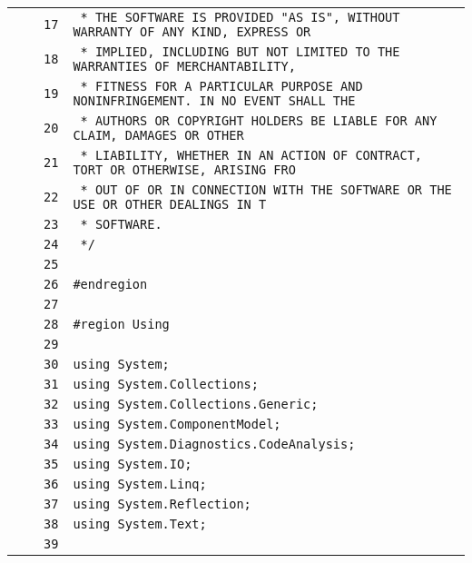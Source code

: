 \documentclass[a4paper,10pt]{article}
\begin{document}
\begin{longtable}[l]{lrrl}
\cellcolor{gray} &  & \verb~17~ & \verb~ * THE SOFTWARE IS PROVIDED "AS IS", WITHOUT WARRANTY OF ANY KIND, EXPRESS OR~\\
\cellcolor{gray} &  & \verb~18~ & \verb~ * IMPLIED, INCLUDING BUT NOT LIMITED TO THE WARRANTIES OF MERCHANTABILITY,~\\
\cellcolor{gray} &  & \verb~19~ & \verb~ * FITNESS FOR A PARTICULAR PURPOSE AND NONINFRINGEMENT. IN NO EVENT SHALL THE~\\
\cellcolor{gray} &  & \verb~20~ & \verb~ * AUTHORS OR COPYRIGHT HOLDERS BE LIABLE FOR ANY CLAIM, DAMAGES OR OTHER~\\
\cellcolor{gray} &  & \verb~21~ & \verb~ * LIABILITY, WHETHER IN AN ACTION OF CONTRACT, TORT OR OTHERWISE, ARISING FRO~\\
\cellcolor{gray} &  & \verb~22~ & \verb~ * OUT OF OR IN CONNECTION WITH THE SOFTWARE OR THE USE OR OTHER DEALINGS IN T~\\
\cellcolor{gray} &  & \verb~23~ & \verb~ * SOFTWARE.~\\
\cellcolor{gray} &  & \verb~24~ & \verb~ */~\\
\cellcolor{gray} &  & \verb~25~ & \verb~~\\
\cellcolor{gray} &  & \verb~26~ & \verb~#endregion~\\
\cellcolor{gray} &  & \verb~27~ & \verb~~\\
\cellcolor{gray} &  & \verb~28~ & \verb~#region Using~\\
\cellcolor{gray} &  & \verb~29~ & \verb~~\\
\cellcolor{gray} &  & \verb~30~ & \verb~using System;~\\
\cellcolor{gray} &  & \verb~31~ & \verb~using System.Collections;~\\
\cellcolor{gray} &  & \verb~32~ & \verb~using System.Collections.Generic;~\\
\cellcolor{gray} &  & \verb~33~ & \verb~using System.ComponentModel;~\\
\cellcolor{gray} &  & \verb~34~ & \verb~using System.Diagnostics.CodeAnalysis;~\\
\cellcolor{gray} &  & \verb~35~ & \verb~using System.IO;~\\
\cellcolor{gray} &  & \verb~36~ & \verb~using System.Linq;~\\
\cellcolor{gray} &  & \verb~37~ & \verb~using System.Reflection;~\\
\cellcolor{gray} &  & \verb~38~ & \verb~using System.Text;~\\
\cellcolor{gray} &  & \verb~39~ & \verb~~\\

\end{longtable}
\end{document}

